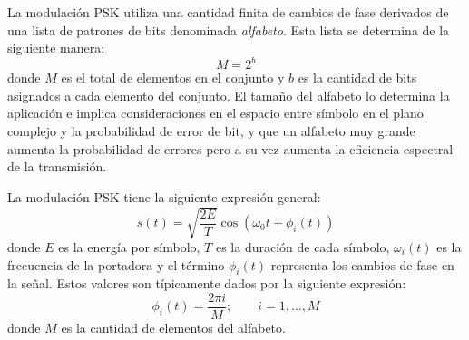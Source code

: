 La modulaci\'on PSK utiliza una cantidad finita de cambios de fase derivados de
una lista de patrones de bits denominada \emph{alfabeto}. Esta lista se
determina de la siguiente manera:
\begin{equation}\label{eq:levels}
M=2^b
\end{equation}
donde $M$ es el total de elementos en el conjunto y $b$ es la cantidad de bits
asignados a cada elemento del conjunto. El tama\~no del alfabeto lo determina la
aplicaci\'on e implica consideraciones en el espacio entre s\'imbolo en el plano
complejo y la probabilidad de error de bit, y que un alfabeto muy grande aumenta
la probabilidad de errores pero a su vez aumenta la eficiencia espectral de la
transmisi\'on.

La modulaci\'on PSK tiene la siguiente expresi\'on general:
\begin{equation}\label{eq:pskgen}
s(t)=\sqrt{\frac{2E}{T}}\cos(\omega_0t+\phi_i(t))
\end{equation}
donde $E$ es la energ\'ia por s\'imbolo, $T$ es la duraci\'on de cada s\'imbolo,
$\omega_i(t)$ es la frecuencia de la portadora y el t\'ermino $\phi_i(t)$
representa los cambios de fase en la se\~nal. Estos valores son t\'ipicamente
dados por la siguiente expresi\'on:
\begin{equation}\label{eq:levelfase}
\phi_i(t)=\frac{2\pi i}{M}; \qquad i=1,\ldots,M 
\end{equation}
donde $M$ es la cantidad de elementos del alfabeto.

